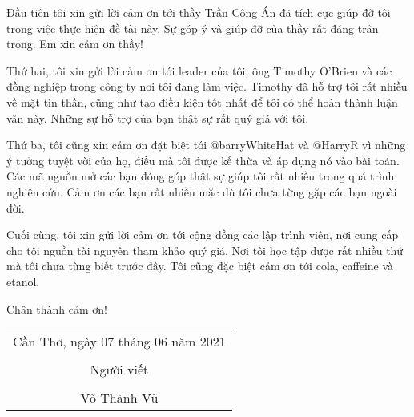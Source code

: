 \documentclass[./thesis.tex]{subfiles}
\begin{document}
Đầu tiên tôi xin gửi lời cảm ơn tới thầy Trần Công Án đã tích cực giúp đỡ tôi trong việc thực hiện đề tài này. Sự góp ý và giúp đỡ của thầy rất đáng trân trọng. Em xin cảm ơn thầy!\par

Thứ hai, tôi xin gửi lời cảm ơn tới leader của tôi, ông Timothy O'Brien và các đồng nghiệp trong công ty nơi tôi đang làm việc. Timothy đã hỗ trợ tôi rất nhiều về mặt tin thần, cũng như tạo điều kiện tốt nhất để tôi có thể hoàn thành luận văn này. Những sự hỗ trợ của bạn thật sự rất quý giá với tôi.\par

Thứ ba, tôi cũng xin cảm ơn đặt biệt tới @barryWhiteHat và @HarryR vì những ý tưởng tuyệt vời của họ, điều mà tôi được kế thừa và áp dụng nó vào bài toán. Các mã nguồn mở các bạn đóng góp thật sự giúp tôi rất nhiều trong quá trình nghiên cứu. Cảm ơn các bạn rất nhiều mặc dù tôi chưa từng gặp các bạn ngoài đời.\par

Cuối cùng, tôi xin gửi lời cảm ơn tới cộng đồng các lập trình viên, nơi cung cấp cho tôi nguồn tài nguyên tham khảo quý giá. Nơi tôi học tập được rất nhiều thứ mà tôi chưa từng biết trước đây. Tôi cũng đặc biệt cảm ơn tới cola, caffeine và etanol.\par

Chân thành cảm ơn!

\hspace*{\fill}
\begin{tabular}{@{}c@{}} 

\\Cần Thơ, ngày 07 tháng 06 năm 2021\\ \\
Người viết\\ \\
Võ Thành Vũ
\end{tabular}
\end{document}
